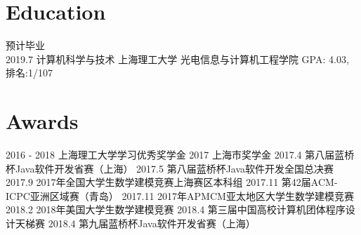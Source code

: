 \documentclass[letterpaper,UTF8]{twentysecondcv} %
\begin{document}
\makeprofile %

\section{Education}

\begin{twenty} %
	\twentyitem
    	{预计毕业 \\ 2019.7}
        {计算机科学与技术}
        {}
        {上海理工大学 光电信息与计算机工程学院}
        {GPA: 4.03, 排名:1/107}
\end{twenty}


\section{Awards}
\begin{twenty}
	\twentyitem
    	{2016 - 2018}
        {上海理工大学学习优秀奖学金}
        {\textbf{{}}}
        {}
        {}
    \twentyitem
        {2017}
        {上海市奖学金}
        {\textbf{{}}}
        {}
        {}
    \twentyitem
        {2017.4}
        {第八届蓝桥杯Java软件开发省赛（上海）}
        {\textbf{{}}}
        {}
        {}
    \twentyitem
        {2017.5}
        {第八届蓝桥杯Java软件开发全国总决赛}
        {\textbf{{}}}
        {}
        {}
    \twentyitem
        {2017.9}
        {2017年全国大学生数学建模竞赛上海赛区本科组}
        {\textbf{{}}}
        {}
        {}
    \twentyitem
        {2017.11}
        {第42届ACM-ICPC亚洲区域赛（青岛）}
        {\textbf{{}}}
        {}
        {}
    \twentyitem
        {2017.11}
        {2017年APMCM亚太地区大学生数学建模竞赛}
        {\textbf{{}}}
        {}
        {}
    \twentyitem
        {2018.2}
        {2018年美国大学生数学建模竞赛}
        {\textbf{{}}}
        {}
        {}
    \twentyitem
        {2018.4}
        {第三届中国高校计算机团体程序设计天梯赛}
        {\textbf{{}}}
        {}
        {}
    \twentyitem
        {2018.4}
        {第九届蓝桥杯Java软件开发省赛（上海）}
        {\textbf{{}}}
        {}
        {}
\end{twenty}
\end{document}
